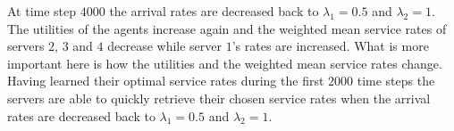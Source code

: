 At time step \(4000\) the arrival rates are decreased back to \(\lambda_1 =
0.5\) and \(\lambda_2 = 1\).
The utilities of the agents increase again and the weighted mean service rates
of servers \(2\), \(3\) and \(4\) decrease while server \(1\)'s rates are
increased.
What is more important here is how the utilities and the weighted mean service
rates change.
Having learned their optimal service rates during the first \(2000\) time steps
the servers are able to quickly retrieve their chosen service rates when the
arrival rates are decreased back to \(\lambda_1 = 0.5\) and \(\lambda_2 = 1\).
